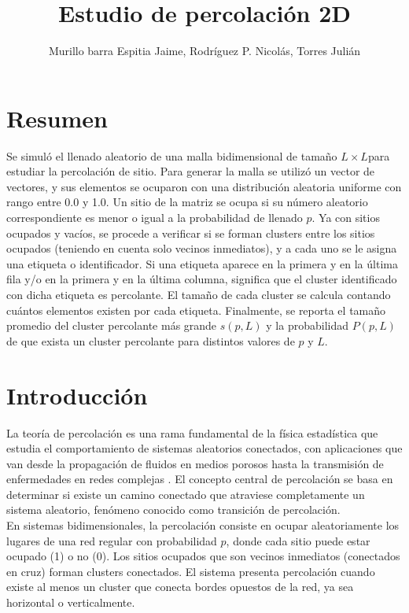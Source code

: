 \documentclass[10pt,twocolumn]{article}
\title{Estudio de percolación 2D}
\author{Murillo barra Espitia Jaime, Rodríguez P. Nicolás, Torres Julián}
\begin{document}
\maketitle

\section{Resumen}
    Se simuló el llenado aleatorio de una malla bidimensional de tamaño $L\times L$para estudiar la percolación de sitio. Para generar la malla se
    utilizó un vector de vectores, y sus elementos se ocuparon con una distribución aleatoria uniforme con rango entre 0.0 y 1.0.
    Un sitio de la matriz se ocupa si su número aleatorio correspondiente es menor o igual a la probabilidad de llenado $p$.
    Ya con sitios ocupados y vacíos, se procede a verificar si se forman clusters entre los sitios ocupados (teniendo en cuenta
    solo vecinos inmediatos), y a cada uno se le asigna una etiqueta o identificador. Si una etiqueta aparece en la primera y en la última fila
    y/o en la primera y en la última columna, significa que el cluster identificado con dicha etiqueta es percolante. El tamaño de cada cluster
    se calcula contando cuántos elementos existen por cada etiqueta. Finalmente, se reporta el tamaño promedio del cluster percolante más grande
    $s(p, L)$ y la probabilidad $P(p, L)$ de que exista un cluster percolante para distintos valores de $p$ y $L$.

\section{Introducción}
    La teoría de percolación es una rama fundamental de la física estadística que estudia el comportamiento de sistemas aleatorios 
    conectados, con aplicaciones que van desde la propagación de fluidos en medios porosos hasta la transmisión de enfermedades en redes 
    complejas \cite{stauffer1994introduction}. El concepto central de percolación se basa en determinar si existe un 
    camino conectado que atraviese completamente un sistema aleatorio, fenómeno conocido como transición de percolación.\\

    En sistemas bidimensionales, la percolación consiste en ocupar aleatoriamente los lugares de una red regular con probabilidad $p$, 
    donde cada sitio puede estar ocupado (1) o no (0). Los sitios ocupados que son vecinos inmediatos (conectados en cruz) forman clusters 
    conectados. El sistema presenta percolación cuando existe al menos un cluster que conecta bordes opuestos de la red, ya sea horizontal 
    o verticalmente.\\
\end{document}
